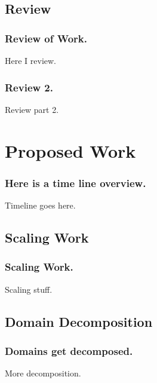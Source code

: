 \documentclass[compress]{beamer}
\begin{document}
\subsection[Review]{Review}
\begin{frame}
\frametitle{Review of Work.}

Here I review.

\end{frame}
\begin{frame}
\frametitle{Review 2.}

Review part 2.

\end{frame}
\section[Proposed Work]{Proposed Work}
\begin{frame}
\frametitle{Here is a time line overview.}

Timeline goes here.

\end{frame}
\subsection[Scaling]{Scaling Work}
\begin{frame}
\frametitle{Scaling Work.}

Scaling stuff.

\end{frame}
\subsection[Domain Decomposition]{Domain Decomposition}
\begin{frame}
\frametitle{Domains get decomposed.}

More decomposition.

\end{frame}
\end{document}
